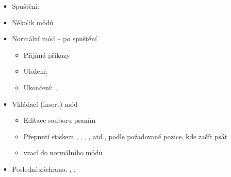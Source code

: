 \begin{frame}{}

  \begin{itemize}
    \item Spuštění: 

    \pause

    \item Několik módů

    \pause

    \item Normální mód -- po spuštění
    \begin{itemize}
      \item Přijímá příkazy
      \item Uložení: 
      \item Ukončení: ,  = 
    \end{itemize}

    \pause

    \item Vkládací (insert) mód
    \begin{itemize}
      \item Editace souboru psaním
      \item Přepnutí stiskem , , , , atd., podle
        požadované pozice, kde začít psát
      \item {} vrací do normálního módu
    \end{itemize}

    \pause

    \item Poslední záchrana: , , 

  \end{itemize}

\end{frame}



